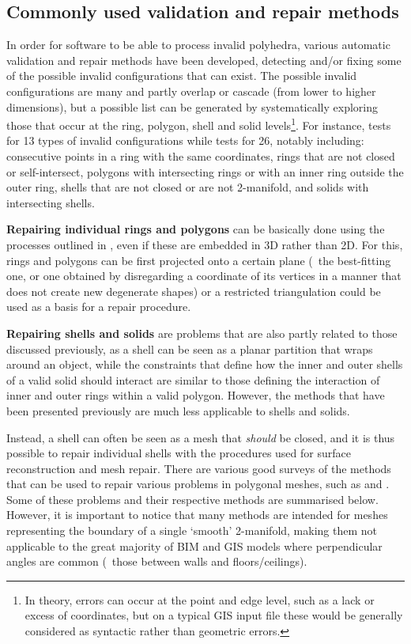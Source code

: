 \subsection{Commonly used validation and repair methods}

In order for software to be able to process invalid polyhedra, various automatic validation and repair methods have been developed, detecting and/or fixing some of the possible invalid configurations that can exist.
The possible invalid configurations are many and partly overlap or cascade (from lower to higher dimensions), but a possible list can be generated by systematically exploring those that occur at the ring, polygon, shell and solid levels\footnote{In theory, errors can occur at the point and edge level, such as a lack or excess of coordinates, but on a typical GIS input file these would be generally considered as syntactic rather than geometric errors.}.
For instance, \citet{Wagner13} tests for 13 types of invalid configurations while \citet{Ledoux13} tests for 26, notably including: consecutive points in a ring with the same coordinates, rings that are not closed or self-intersect, polygons with intersecting rings or with an inner ring outside the outer ring, shells that are not closed or are not 2-manifold, and solids with intersecting shells.

\textbf{Repairing individual rings and polygons} can be basically done using the processes outlined in , even if these are embedded in 3D rather than 2D.
For this, rings and polygons can be first projected onto a certain plane (\eg\ the best-fitting one, or one obtained by disregarding a coordinate of its vertices in a manner that does not create new degenerate shapes) or a restricted triangulation \citep[Ch.~13]{Cheng12} could be used as a basis for a repair procedure.

\textbf{Repairing shells and solids} are problems that are also partly related to those discussed previously, as
a shell can be seen as a planar partition that wraps around an object, while the constraints that define how the inner and outer shells of a valid solid should interact are similar to those defining the interaction of inner and outer rings within a valid polygon.
However, the methods that have been presented previously are much less applicable to shells and solids.

Instead, a shell can often be seen as a mesh that \emph{should} be closed, and it is thus possible to repair individual shells with the procedures used for surface reconstruction and mesh repair.
There are various good surveys of the methods that can be used to repair various problems in polygonal meshes, such as \citet{Ju09} and \citet{Attene13}.
Some of these problems and their respective methods are summarised below.
However, it is important to notice that many methods are intended for meshes representing the boundary of a single `smooth' 2-manifold, making them not applicable to the great majority of BIM and GIS models where perpendicular angles are common (\eg\ those between walls and floors/ceilings).

